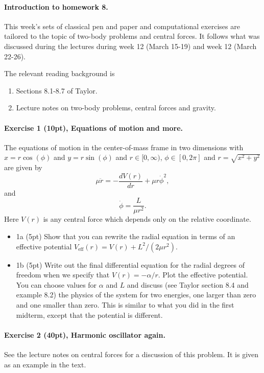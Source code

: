 \documentclass[%
oneside,                 %
final,                   %
10pt]{article}
\begin{document}
\noindent
\paragraph{Introduction to homework 8.}
This week's sets of classical pen and paper and computational
exercises are tailored to the topic of two-body problems and central
forces. It follows what was discussed during the lectures during week
12 (March 15-19) and week 12 (March 22-26).

The relevant reading background is
\begin{enumerate}
\item Sections 8.1-8.7 of Taylor.

\item Lecture notes on two-body problems, central forces and gravity.
\end{enumerate}

\noindent
\paragraph{Exercise 1 (10pt), Equations of motion and more.}
The equations of motion in the center-of-mass frame in two dimensions with $x=r\cos{(\phi)}$ and $y=r\sin{(\phi)}$ and
$r\in [0,\infty)$, $\phi\in [0,2\pi]$ and $r=\sqrt{x^2+y^2}$ are given by
\[
\mu \ddot{r}=-\frac{dV(r)}{dr}+\mu r\dot{\phi}^2,
\]
and
\[
\dot{\phi}=\frac{L}{\mu r^2}.
\]
Here $V(r)$ is any central force which depends only on the relative coordinate.
\begin{itemize}
\item 1a (5pt) Show that you can rewrite the radial equation in terms of an effective potential $V_{\mathrm{eff}}(r)=V(r)+L^2/(2\mu r^2)$. 

\item 1b (5pt) Write out the final differential equation for the radial degrees of freedom when we specify that $V(r)=-\alpha/r$.  Plot the effective potential. You can choose values for $\alpha$ and $L$ and discuss (see Taylor section 8.4 and example 8.2) the physics of the system for two energies, one larger than zero and one smaller than zero. This is similar to what you did in the first midterm, except that the potential is different.
\end{itemize}

\noindent
\paragraph{Exercise 2 (40pt), Harmonic oscillator again.}
See the lecture notes on central forces for a discussion of this problem. It is given as an example in the text.
\end{document}

